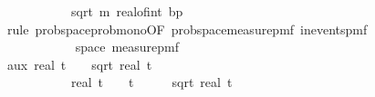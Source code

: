 \begin{isabellebody}
\ \ \ \ \ \ \ \ {\isasymge}\ {}\ {\isacharasterisk}{\kern0pt}\ sqrt\ {\isacharparenleft}{\kern0pt}m\ {\isacharasterisk}{\kern0pt}{\isacharparenleft}{\kern0pt}real{\isacharunderscore}{\kern0pt}of{\isacharunderscore}{\kern0pt}int\ b{\isacharplus}{\kern0pt}{}{\isacharparenright}{\kern0pt}{\isacharslash}{\kern0pt}p{\isacharparenright}{\kern0pt}{\isacharparenright}{\kern0pt}{\isachardoublequoteclose}\isanewline
\ \ \ \ \ \ \isamarkupfalse%
\ {\isacharparenleft}{\kern0pt}rule\ prob{\isacharunderscore}{\kern0pt}space{\isachardot}{\kern0pt}prob{\isacharunderscore}{\kern0pt}mono{\isacharbrackleft}{\kern0pt}OF\ prob{\isacharunderscore}{\kern0pt}space{\isacharunderscore}{\kern0pt}measure{\isacharunderscore}{\kern0pt}pmf\ in{\isacharunderscore}{\kern0pt}events{\isacharunderscore}{\kern0pt}pmf{\isacharbrackright}{\kern0pt}{\isacharparenright}{\kern0pt}\isanewline
\ \ \ \ \ \ \ \ \isamarkupfalse%
\ {\isasymomega}\isanewline
\ \ \ \ \ \ \ \ \isamarkupfalse%
\ {\isachardoublequoteopen}{\isasymomega}\ {\isasymin}\ space\ {\isacharparenleft}{\kern0pt}measure{\isacharunderscore}{\kern0pt}pmf\ {\isasymOmega}\isanewline
\ \ \ \ \ \ \ \ \isamarkupfalse%
\ aux{\isacharcolon}{\kern0pt}\ {\isachardoublequoteopen}{\isacharparenleft}{\kern0pt}real\ t\ {\isacharplus}{\kern0pt}\ {}\ {\isacharasterisk}{\kern0pt}\ sqrt\ {\isacharparenleft}{\kern0pt}real\ t\ {\isacharslash}{\kern0pt}\ {\isacharparenleft}{\kern0pt}{}\ {\isacharminus}{\kern0pt}\ {\isasymdelta}{\isacharprime}{\kern0pt}{\isacharparenright}{\kern0pt}\ {\isacharplus}{\kern0pt}\ {}{\isacharparenright}{\kern0pt}{\isacharparenright}{\kern0pt}\ {\isacharasterisk}{\kern0pt}\ {\isacharparenleft}{\kern0pt}{}\ {\isacharminus}{\kern0pt}\ {\isasymdelta}{\isacharprime}{\kern0pt}{\isacharparenright}{\kern0pt}\ {\isacharequal}{\kern0pt}\isanewline
\ \ \ \ \ \ \ \ \ \ \ real\ t\ {\isacharminus}{\kern0pt}\ {\isasymdelta}{\isacharprime}{\kern0pt}\ {\isacharasterisk}{\kern0pt}\ t\ {\isacharplus}{\kern0pt}\ {}\ {\isacharasterisk}{\kern0pt}\ {\isacharparenleft}{\kern0pt}{\isacharparenleft}{\kern0pt}{}{\isacharminus}{\kern0pt}{\isasymdelta}{\isacharprime}{\kern0pt}{\isacharparenright}{\kern0pt}\ {\isacharasterisk}{\kern0pt}\ sqrt{\isacharparenleft}{\kern0pt}\ real\ t\ {\isacharslash}{\kern0pt}\ {\isacharparenleft}{\kern0pt}{}{\isacharminus}{\kern0pt}{\isasymdelta}{\isacharprime}{\kern0pt}{\isacharparenright}{\kern0pt}\ {\isacharplus}{\kern0pt}\ {}{\isacharparenright}{\kern0pt}{\isacharparenright}{\kern0pt}{\isachardoublequoteclose}\isanewline

\end{isabellebody}
